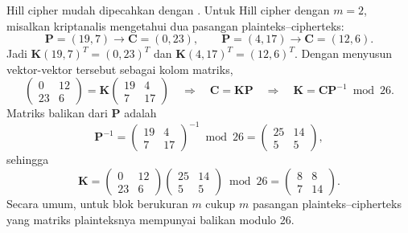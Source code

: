 Hill cipher mudah dipecahkan dengan . Untuk Hill cipher dengan $m = 2$, misalkan kriptanalis mengetahui dua pasangan plainteks--cipherteks:
\[
\mathbf{P} = (19, 7) \rightarrow \mathbf{C} = (0, 23), \qquad \mathbf{P} = (4, 17) \rightarrow \mathbf{C} = (12, 6).
\]
Jadi $\mathbf{K}(19, 7)^T = (0, 23)^T$ dan $\mathbf{K}(4, 17)^T = (12, 6)^T$. Dengan menyusun vektor-vektor tersebut sebagai kolom matriks,
\[
\begin{pmatrix} 0 & 12 \\ 23 & 6 \end{pmatrix} = \mathbf{K} \begin{pmatrix} 19 & 4 \\ 7 & 17 \end{pmatrix}
\quad \Rightarrow \quad \mathbf{C} = \mathbf{K}\mathbf{P} \quad \Rightarrow \quad \mathbf{K} = \mathbf{C}\mathbf{P}^{-1} \bmod 26.
\]
Matriks balikan dari $\mathbf{P}$ adalah
\[
\mathbf{P}^{-1} = \begin{pmatrix} 19 & 4 \\ 7 & 17 \end{pmatrix}^{-1} \bmod 26 = \begin{pmatrix} 25 & 14 \\ 5 & 5 \end{pmatrix},
\]
sehingga
\[
\mathbf{K} = \begin{pmatrix} 0 & 12 \\ 23 & 6 \end{pmatrix} \begin{pmatrix} 25 & 14 \\ 5 & 5 \end{pmatrix} \bmod 26 = \begin{pmatrix} 8 & 8 \\ 7 & 14 \end{pmatrix}.
\]
Secara umum, untuk blok berukuran $m$ cukup $m$ pasangan plainteks--cipherteks yang matriks plainteksnya mempunyai balikan modulo 26.


